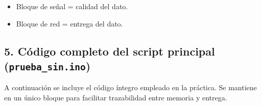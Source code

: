 \documentclass[11pt]{article}
\providecommand{\tightlist}{%
      \setlength{\itemsep}{0pt}\setlength{\parskip}{0pt}}
\begin{document}
\begin{itemize}
\tightlist
\item
  Bloque de señal = calidad del dato.
\item
  Bloque de red = entrega del dato.
\end{itemize}

    \subsection{\texorpdfstring{5. Código completo del script principal
(\texttt{prueba\_sin.ino})}{5. Código completo del script principal (prueba\_sin.ino)}}\label{cuxf3digo-completo-del-script-principal-prueba_sin.ino}

A continuación se incluye el código íntegro empleado en la práctica. Se
mantiene en un único bloque para facilitar trazabilidad entre memoria y
entrega.
\end{document}
